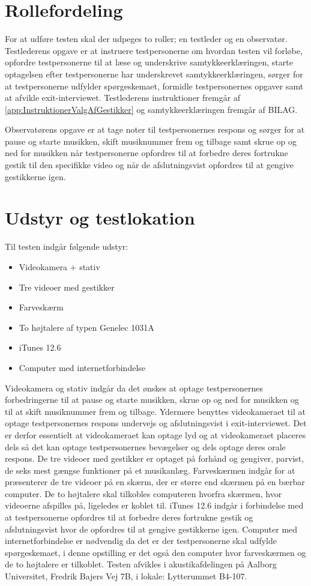 \section{Rollefordeling}
\label{RollerfordelingValgAfGestikker}
%
For at udføre testen skal der udpeges to roller; en testleder og en observatør. Testlederens opgave er at instruere testpersonerne om hvordan testen vil forløbe, opfordre testpersonerne til at læse og underskrive samtykkeerklæringen, starte optagelsen efter testpersonerne har underskrevet samtykkeerklæringen, sørger for at testpersonerne udfylder spørgeskemaet, formidle testpersonernes opgaver samt at afvikle exit-interviewet. Testlederens instruktioner fremgår af \autoref{app:InstruktionerValgAfGestikker} og samtykkeerklæringen fremgår af BILAG. 

Observatørens opgave er at tage noter til testpersonernes respons og sørger for at pause og starte musikken, skift musiknummer frem og tilbage samt skrue op og ned for musikken når testpersonerne opfordres til at forbedre deres fortrukne gestik til den specifikke video og når de afslutningsvist opfordres til at gengive gestikkerne igen. 

\section{Udstyr og testlokation}
\label{UdstyrOgTestlokationValgAfGestikker}
%
Til testen indgår følgende udstyr:
%
\begin{itemize}
  \item Videokamera + stativ
  \item Tre videoer med gestikker
  \item Farveskærm 
  \item To højtalere af typen Genelec 1031A
  \item iTunes 12.6  
  \item Computer med internetforbindelse\blankline
\end{itemize}
% 
Videokamera og stativ indgår da det ønskes at optage testpersonernes forbedringerne til at pause og starte musikken, skrue op og ned for musikken og til at skift musiknummer frem og tilbage. Ydermere benyttes videokameraet til at optage testpersonernes respons undervejs og afslutningsvist i exit-interviewet. Det er derfor essentielt at videokameraet kan optage lyd og at videokameraet placeres dels så det kan optage testpersonernes bevægelser og dels optage deres orale respons. De tre videoer med gestikker er optaget på forhånd og gengiver, parvist, de seks mest gængse funktioner på et musikanlæg. Farveskærmen indgår for at præsenterer de tre videoer på en skærm, der er større end skærmen på en bærbar computer. De to højtalere skal tilkobles computeren hvorfra skærmen, hvor videoerne afspilles på, ligeledes er koblet til. iTunes 12.6 indgår i forbindelse med at testpersonerne opfordres til at forbedre deres fortrukne gestik og afslutningsvist hvor de opfordres til at gengive gestikkerne igen. Computer med internetforbindelse er nødvendig da det er der testpersonerne skal udfylde spørgeskemaet, i denne opstilling er det også den computer hvor farveskærmen og de to højtalere er tilkoblet.\blankline
% 
Testen afvikles i akustikafdelingen på Aalborg Universitet, Fredrik Bajers Vej 7B, i lokale: Lytterummet B4-107. 
%